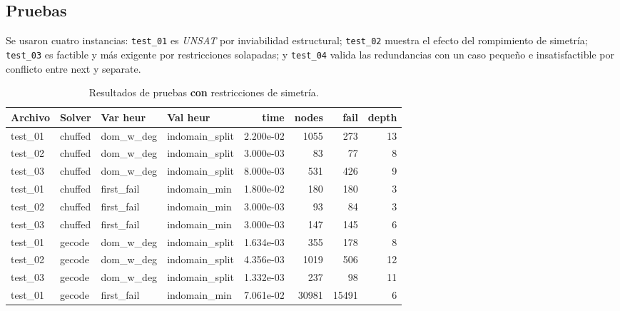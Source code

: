 
\subsection{Pruebas}\label{sec:05-reunion-pruebas}
Se usaron cuatro instancias: \texttt{test\_01} es \emph{UNSAT} por inviabilidad estructural; \texttt{test\_02} muestra el efecto del rompimiento de simetría; \texttt{test\_03} es factible y más exigente por restricciones solapadas; y \texttt{test\_04} valida las redundancias con un caso pequeño e insatisfactible por conflicto entre \textsf{next} y \textsf{separate}.


\begin{compactfloats}
  \begin{table}[H]
    \centering
    \small
    \setlength{\tabcolsep}{1.8pt}
    \caption{Resultados de pruebas \textbf{con} restricciones de simetría.}
    \label{tab:pruebas-reunion-on}
    \begin{tabular}{l l l l r r r r}
      \toprule
      \textbf{Archivo} & \textbf{Solver} & \textbf{Var heur} & \textbf{Val heur} & \textbf{time} & \textbf{nodes} & \textbf{fail} & \textbf{depth} \\
      \midrule
      test\_01 & chuffed & dom\_w\_deg  & indomain\_split & 2.200e-02 &  1055 &  273 & 13 \\
      test\_02 & chuffed & dom\_w\_deg  & indomain\_split & 3.000e-03 &    83 &   77 &  8 \\
      test\_03 & chuffed & dom\_w\_deg  & indomain\_split & 8.000e-03 &   531 &  426 &  9 \\
      \midrule
      test\_01 & chuffed & first\_fail  & indomain\_min   & 1.800e-02 &   180 &  180 &  3 \\
      test\_02 & chuffed & first\_fail  & indomain\_min   & 3.000e-03 &    93 &   84 &  3 \\
      test\_03 & chuffed & first\_fail  & indomain\_min   & 3.000e-03 &   147 &  145 &  6 \\
      \midrule
      test\_01 & gecode  & dom\_w\_deg  & indomain\_split & 1.634e-03 &   355 &  178 &  8 \\
      test\_02 & gecode  & dom\_w\_deg  & indomain\_split & 4.356e-03 &  1019 &  506 & 12 \\
      test\_03 & gecode  & dom\_w\_deg  & indomain\_split & 1.332e-03 &   237 &   98 & 11 \\
      \midrule
      test\_01 & gecode  & first\_fail  & indomain\_min   & 7.061e-02 & 30981 & 15491 &  6 \\

\end{tabular}
\end{table}
\end{compactfloats}
